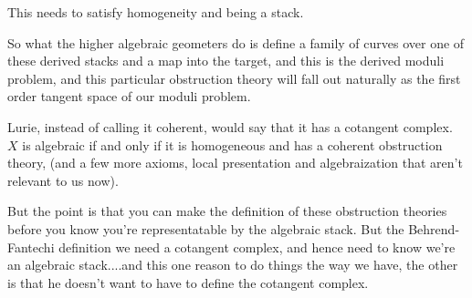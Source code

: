 \documentclass{amsart}
\theoremstyle{definition}
\begin{document}
This needs to satisfy homogeneity and being a stack.

So what the higher algebraic geometers do is define a family of curves over one of these derived stacks and a map into the target, and this is the derived moduli problem, and this particular obstruction theory will fall out naturally as the first order tangent space of our moduli problem.

Lurie, instead of calling it coherent, would say that it has a cotangent complex. $X$ is algebraic if and only if it is homogeneous and has a coherent obstruction theory, (and a few more axioms, local presentation and algebraization that aren't relevant to us now).

But the point is that you can make the definition of these obstruction theories before you know you're representatable by the algebraic stack.  But the Behrend-Fantechi definition we need a cotangent complex, and hence need to know we're an algebraic stack....and this one reason to do things the way we have, the other is that he doesn't want to have to define the cotangent complex.
\end{document}
